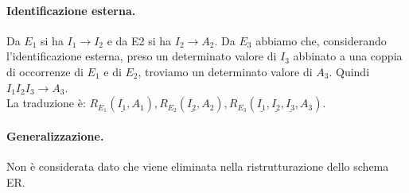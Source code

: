 \paragraph{Identificazione esterna.} Da $E_1$ si ha $I_1 \rightarrow I_2$ e da E2 si ha $I_2 \rightarrow A_2$. Da $E_3$ abbiamo che, considerando l’identificazione esterna, preso un determinato valore di $I_3$ abbinato a una coppia di occorrenze di $E_1$ e di $E_2$, troviamo un determinato valore di $A_3$. Quindi $I_1 I_2 I_3 \rightarrow A_3$.\\ La traduzione è: $R_{E_1}(\underline{I_1}, A_1), R_{E_2}(\underline{I_2}, A_2), R_{E_3}(\underline{I_1}, \underline{I_2}, \underline{I_3}, A_3)$.

\paragraph{Generalizzazione.} Non è considerata dato che viene eliminata nella ristrutturazione dello schema ER.

